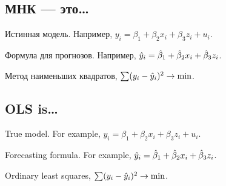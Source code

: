 
\maketitle


\newpage

\tableofcontents{}




\newpage

\begin{translation-ru}
\section{МНК — это\ldots}

\begin{leftbar}
Истинная модель. Например, $y_i = \beta_1 + \beta_2 x_i + \beta_3 z_i + u_i$.

Формула для прогнозов. Например, $\hat{y}_i = \hat{\beta}_1 + \hat{\beta}_2 x_i + \hat{\beta}_3 z_i$.

Метод наименьших квадратов, $\sum (y_i - \hat{y}_i)^2 \to \min$.  
\end{leftbar}  
\end{translation-ru}

\begin{translation-en}
\section{OLS is\ldots}

\begin{leftbar}
True model. For example, $y_i = \beta_1 + \beta_2 x_i + \beta_3 z_i + u_i$.

Forecasting formula. For example, $\hat{y}_i = \hat{\beta}_1 + \hat{\beta}_2 x_i + \hat{\beta}_3 z_i$.

Ordinary least squares, $\sum (y_i - \hat{y}_i)^2 \to \min$.  
\end{leftbar}  
\end{translation-en}
  


